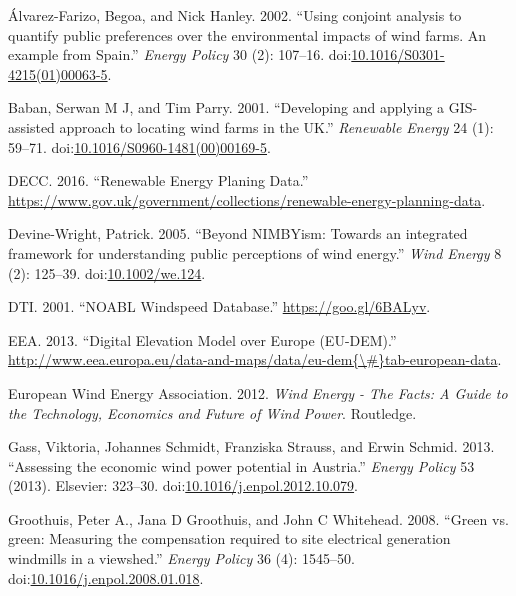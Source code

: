 \documentclass[a4paper,]{article}
\theoremstyle{definition}
\theoremstyle{definition}
\theoremstyle{remark}
\begin{document}
{\hypertarget{ref-Alvarez-Farizo2002}{}
Álvarez-Farizo, Begoa, and Nick Hanley. 2002. ``Using conjoint analysis
to quantify public preferences over the environmental impacts of wind
farms. An example from Spain.'' \emph{Energy Policy} 30 (2): 107--16.
doi:\href{https://doi.org/10.1016/S0301-4215(01)00063-5}{10.1016/S0301-4215(01)00063-5}.

\hypertarget{ref-Baban2001}{}
Baban, Serwan M J, and Tim Parry. 2001. ``Developing and applying a
GIS-assisted approach to locating wind farms in the UK.''
\emph{Renewable Energy} 24 (1): 59--71.
doi:\href{https://doi.org/10.1016/S0960-1481(00)00169-5}{10.1016/S0960-1481(00)00169-5}.

\hypertarget{ref-DECC2016}{}
DECC. 2016. ``Renewable Energy Planing Data.''
\url{https://www.gov.uk/government/collections/renewable-energy-planning-data}.

\hypertarget{ref-Devine-Wright2005a}{}
Devine-Wright, Patrick. 2005. ``Beyond NIMBYism: Towards an integrated
framework for understanding public perceptions of wind energy.''
\emph{Wind Energy} 8 (2): 125--39.
doi:\href{https://doi.org/10.1002/we.124}{10.1002/we.124}.

\hypertarget{ref-DTI2001}{}
DTI. 2001. ``NOABL Windspeed Database.'' \url{https://goo.gl/6BALyv}.

\hypertarget{ref-EEA2013}{}
EEA. 2013. ``Digital Elevation Model over Europe (EU-DEM).''
\href{http://www.eea.europa.eu/data-and-maps/data/eu-dem\%7B/\#\%7Dtab-european-data}{http://www.eea.europa.eu/data-and-maps/data/eu-dem\{\textbackslash{}\#\}tab-european-data}.

\hypertarget{ref-EuropeanWindEnergyAssociation2012}{}
European Wind Energy Association. 2012. \emph{Wind Energy - The Facts: A
Guide to the Technology, Economics and Future of Wind Power}. Routledge.

\hypertarget{ref-Gass2013}{}
Gass, Viktoria, Johannes Schmidt, Franziska Strauss, and Erwin Schmid.
2013. ``Assessing the economic wind power potential in Austria.''
\emph{Energy Policy} 53 (2013). Elsevier: 323--30.
doi:\href{https://doi.org/10.1016/j.enpol.2012.10.079}{10.1016/j.enpol.2012.10.079}.

\hypertarget{ref-Groothuis2008}{}
Groothuis, Peter A., Jana D Groothuis, and John C Whitehead. 2008.
``Green vs. green: Measuring the compensation required to site
electrical generation windmills in a viewshed.'' \emph{Energy Policy} 36
(4): 1545--50.
doi:\href{https://doi.org/10.1016/j.enpol.2008.01.018}{10.1016/j.enpol.2008.01.018}.

}
\end{document}
